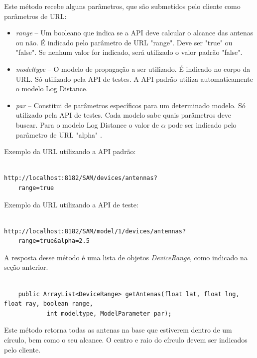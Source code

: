 Este método recebe alguns parâmetros, que são submetidos pelo cliente como parâmetros de URL:

\begin{itemize}
\item \textit{range} -- Um booleano que indica se a API deve calcular o alcance das antenas ou não. É indicado pelo parâmetro de URL "range". Deve ser "true" ou "false". Se nenhum valor for indicado, será utilizado o valor padrão "false".
\item \textit{modeltype} -- O modelo de propagação a ser utilizado. É indicado no corpo da URL. Só utilizado pela API de testes. A API padrão utiliza automaticamente o modelo Log Distance.
\item \textit{par} -- Constitui de parâmetros específicos para um determinado modelo. Só utilizado pela API de testes. Cada modelo sabe quais parâmetros deve buscar. Para o modelo Log Distance o valor de \begin{math} \alpha \end{math} pode ser indicado pelo parâmetro de URL "alpha" .
\end{itemize}

Exemplo da URL utilizando a API padrão:

\begin{lstlisting}	

http://localhost:8182/SAM/devices/antennas?
	range=true

\end{lstlisting}

Exemplo da URL utilizando a API de teste:

\begin{lstlisting}			

http://localhost:8182/SAM/model/1/devices/antennas?
	range=true&alpha=2.5

\end{lstlisting}


A resposta desse método é uma lista de objetos \textit{DeviceRange}, como indicado na seção anterior.

\begin{lstlisting}

	public ArrayList<DeviceRange> getAntenas(float lat, float lng, float ray, boolean range, 
			int modeltype, ModelParameter par);
\end{lstlisting}

Este método retorna todas as antenas na base que estiverem dentro de um círculo, bem como o seu alcance. O centro e raio do círculo devem ser indicados pelo cliente.

